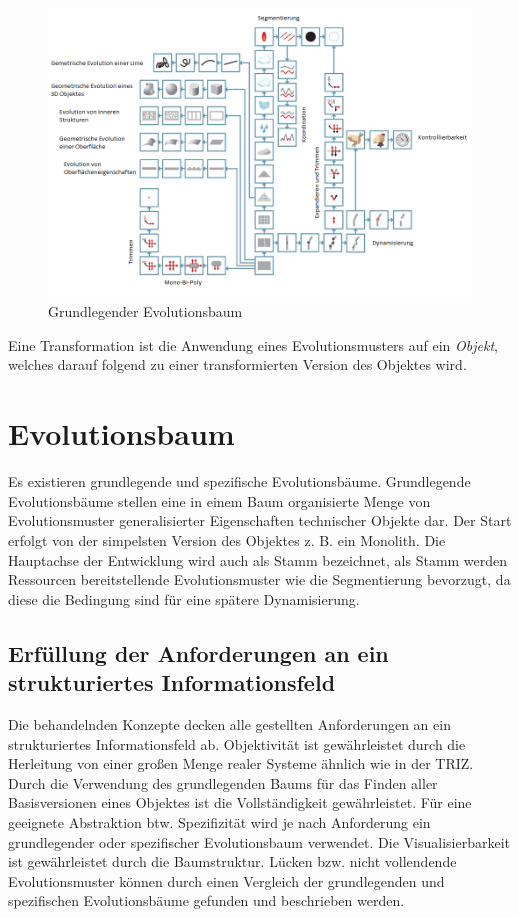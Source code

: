 \documentclass[11pt,a4paper]{article}
\begin{document}
\begin{figure}[htb]
  \centering
  \includegraphics[width=0.9\linewidth]{figures/Basisevolutionsbaum2.png}
  \caption{\small Grundlegender Evolutionsbaum \cite{evo}}
  \label{fig:basic_evo}
\end{figure}

Eine Transformation ist die Anwendung eines Evolutionsmusters auf ein
\emph{Objekt}, welches darauf folgend zu einer transformierten Version des
Objektes wird.

\section{Evolutionsbaum}

Es existieren grundlegende und spezifische Evolutionsbäume. Grundlegende
Evolutionsbäume stellen eine in einem Baum organisierte Menge von
Evolutionsmuster generalisierter Eigenschaften technischer Objekte dar. Der
Start erfolgt von der simpelsten Version des Objektes z. B. ein Monolith. Die
Hauptachse der Entwicklung wird auch als Stamm bezeichnet, als Stamm werden
Ressourcen bereitstellende Evolutionsmuster wie die Segmentierung bevorzugt,
da diese die Bedingung sind für eine spätere Dynamisierung.


\subsection{Erfüllung der Anforderungen an ein strukturiertes Informationsfeld}

Die behandelnden Konzepte decken alle gestellten Anforderungen an ein
strukturiertes Informationsfeld ab. Objektivität ist gewährleistet durch die
Herleitung von einer großen Menge realer Systeme ähnlich wie in der
TRIZ. Durch die Verwendung des grundlegenden Baums für das Finden aller
Basisversionen eines Objektes ist die Vollständigkeit gewährleistet. Für eine
geeignete Abstraktion btw. Spezifizität wird je nach Anforderung ein
grundlegender oder spezifischer Evolutionsbaum verwendet. Die
Visualisierbarkeit ist gewährleistet durch die Baumstruktur. Lücken bzw. nicht
vollendende Evolutionsmuster können durch einen Vergleich der grundlegenden
und spezifischen Evolutionsbäume gefunden und beschrieben werden.
\end{document}
